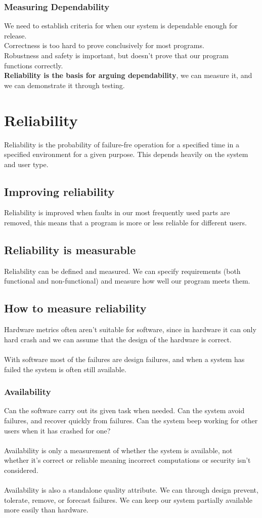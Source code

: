 \subsubsection{Measuring Dependability}
We need to establish criteria for when our system is dependable enough for release.\\
Correctness is too hard to prove conclusively for most programs.\\
Robustness and safety is important, but doesn't prove that our program functions correctly.\\
\textbf{Reliability is the basis for arguing dependability}, we can measure it, and we can demonstrate it through testing.

\section{Reliability}
Reliability is the probability of failure-fre operation for a specified time in a specified environment for a given purpose. This depends heavily on the system and user type.\\
\subsection{Improving reliability}
Reliability is improved when faults in our most frequently used parts are removed, this means that a program is more or less reliable for different users.
\subsection{Reliability is measurable}
Reliability can be defined and measured. We can specify requirements (both functional and non-functional) and measure how well our program meets them.
\subsection{How to measure reliability}
Hardware metrics often aren't suitable for software, since in hardware it can only hard crash and we can assume that the design of the hardware is correct.\\
\\
With software most of the failures are design failures, and when a system has failed the system is often still available.

\subsubsection{Availability}
Can the software carry out its given task when needed. Can the system avoid failures, and recover quickly from failures. Can the system beep working for other users when it has crashed for one?\\
\\
Availability is only a measurement of whether the system is available, not whether it's correct or reliable meaning incorrect computations or security isn't considered.\\
\\
Availability is also a standalone quality attribute. We can through design prevent, tolerate, remove, or forecast failures. We can keep our system partially available more easily than hardware.

